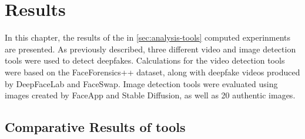 
\chapter{Results}\label{chapter:results}
In this chapter, the results of the in \autoref{sec:analysis-tools} computed experinments are
presented. As previously described, three different video and image detection tools were used
to detect deepfakes. Calculations for the video detection tools were based on the
FaceForensics++ dataset, along with deepfake videos produced by DeepFaceLab and FaceSwap.
Image detection tools were evaluated using images created by FaceApp and Stable Diffusion,
as well as 20 authentic images.

\section{Comparative Results of tools}

